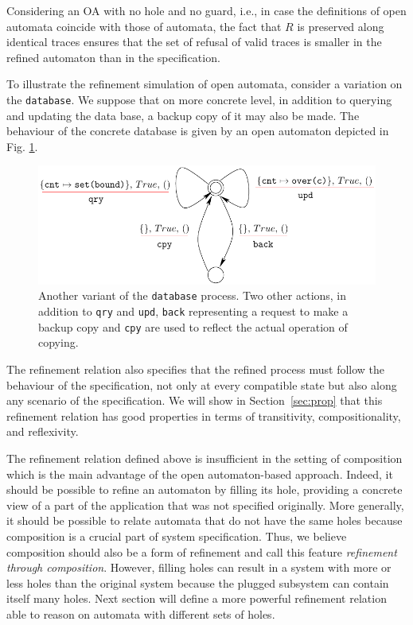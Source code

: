 \documentclass[runningheads]{llncs}
\begin{document}
Considering an OA with no  hole and no guard, i.e., in case the definitions of open automata coincide with those of automata, the fact that $R$ is preserved along identical traces ensures that the set  of refusal of valid traces is smaller in the refined automaton than in the specification.


\begin{example} 
To illustrate the refinement simulation of open automata, consider a variation on the \texttt{database}.  We suppose that on more concrete level, in addition to querying and updating the data base,  a backup copy of it may also be made. The behaviour of the concrete database is given by 
an open automaton  depicted in Fig. \ref{Fig:RefineOA}. 
\end{example}
\begin{figure}[!tb]
 \centering
   \includegraphics[width=.9\textwidth]{Figures/databaseRefine.pdf}
   \caption{Another variant of the \texttt{database} process.  Two other actions,  in addition to  \texttt{qry} and \texttt{upd},  \texttt{back} representing a request to make a backup copy and    \texttt{cpy} are used to reflect the actual operation of copying. \label{Fig:RefineOA}}
\end{figure}

The refinement relation  also specifies that the refined process must follow the behaviour of the specification, not only at every compatible state but also along any scenario of the specification.
We will show in Section~\ref{sec:prop} that this refinement relation has good properties in terms of transitivity, compositionality, and reflexivity.

The refinement relation defined above is insufficient in the setting of composition which is the main advantage of the open automaton-based approach. Indeed, it should be possible to refine an automaton by filling its hole, providing a concrete view of a part of the application that was not specified originally. 
More generally, it should be possible to relate automata that do not have the same holes because composition is a crucial part of system specification.
Thus, we believe composition should also be a form of refinement and call this feature \emph{refinement through composition}.
However, filling holes can result in a system with more or less holes than the original system because the plugged subsystem can contain itself many holes.
Next section will define  a more powerful refinement relation able to reason on automata with different sets of holes.
\end{document}
